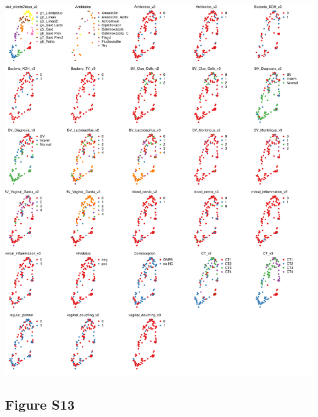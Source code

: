 \documentclass[
]{article}
\begin{document}
\includegraphics[width=1\linewidth]{manuscript_template_files/figure-latex/unnamed-chunk-23-1}

\clearpage

\hypertarget{figure-s13}{%
\subsection{Figure S13}\label{figure-s13}}
\end{document}
